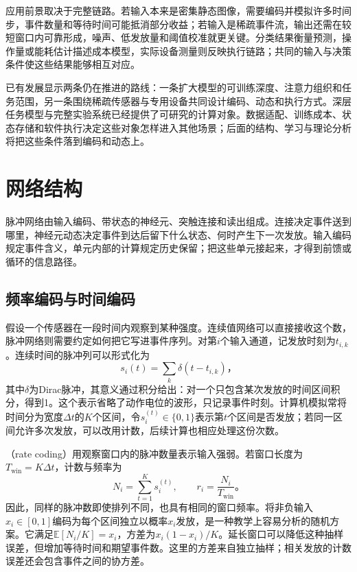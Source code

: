 应用前景取决于完整链路。若输入本来是密集静态图像，需要编码并模拟许多时间步，事件数量和等待时间可能抵消部分收益；若输入是稀疏事件流，输出还需在较短窗口内可靠形成，噪声、低发放量和阈值校准就更关键。分类结果衡量预测，操作量或能耗估计描述成本模型，实际设备测量则反映执行链路；共同的输入与决策条件使这些结果能够相互对应。

已有发展显示两条仍在推进的路线：一条扩大模型的可训练深度、注意力组织和任务范围，另一条围绕稀疏传感器与专用设备共同设计编码、动态和执行方式。深层任务模型与完整实验系统已经提供了可研究的计算对象。数据适配、训练成本、状态存储和软件执行决定这些对象怎样进入其他场景；后面的结构、学习与理论分析将把这些条件落到编码和动态上。

\section{网络结构}
\label{sec:snn-coding-dynamics}

脉冲网络由输入编码、带状态的神经元、突触连接和读出组成。连接决定事件送到哪里，神经元动态决定事件到达后留下什么状态、何时产生下一次发放。输入编码规定事件含义，单元内部的计算规定历史保留；把这些单元接起来，才得到前馈或循环的信息路径。

\subsection{频率编码与时间编码}
\label{sec:snn-coding}

假设一个传感器在一段时间内观察到某种强度。连续值网络可以直接接收这个数，脉冲网络则需要约定如何把它写进事件序列。对第$i$个输入通道，记发放时刻为$t_{i,k}$。连续时间的脉冲列可以形式化为
\begin{equation}
  s_i(t)=\sum_k\delta(t-t_{i,k})\text{，}
  \label{eq:snn-spike-train}
\end{equation}
其中$\delta$为Dirac脉冲，其意义通过积分给出：对一个只包含某次发放的时间区间积分，得到1。这个表示省略了动作电位的波形，只记录事件时刻。计算机模拟常将时间分为宽度$\Delta t$的$K$个区间，令$s_i^{(t)}\in\{0,1\}$表示第$t$个区间是否发放；若同一区间允许多次发放，可以改用计数，后续计算也相应处理这份次数。

（rate coding）用观察窗口内的脉冲数量表示输入强弱。若窗口长度为$T_{\mathrm{win}}=K\Delta t$，计数与频率为
\begin{equation}
  N_i=\sum_{t=1}^{K}s_i^{(t)},\qquad
  r_i=\frac{N_i}{T_{\mathrm{win}}}\text{。}
  \label{eq:snn-rate-code}
\end{equation}
因此，同样的脉冲数即使排列不同，也具有相同的窗口频率。将非负输入$x_i\in[0,1]$编码为每个区间独立以概率$x_i$发放，是一种教学上容易分析的随机方案。它满足$\mathbb E[N_i/K]=x_i$，方差为$x_i(1-x_i)/K$。延长窗口可以降低这种抽样误差，但增加等待时间和期望事件数。这里的方差来自独立抽样；相关发放的计数误差还会包含事件之间的协方差。

